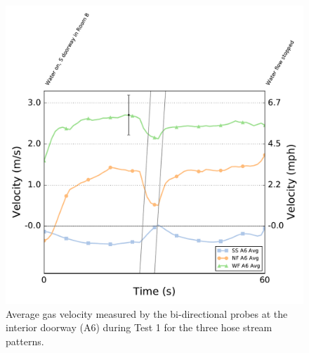 \documentclass[12pt,oneside]{book}
\begin{document}
\begin{figure}[!ht]
	\includegraphics[width=0.86\columnwidth]{../Figures/Plots/HOSE_IXXAXX_BDP_A6_stream_avgs}
	\caption[Average gas velocity through the interior doorway during Test 1 for the three hose stream patterns.]{Average gas velocity measured by the bi-directional probes at the interior doorway (A6) during Test 1 for the three hose stream patterns.}
	\label{fig:Test_1_BDP_A6_Avg_All}
\end{figure}
\FloatBarrier
\end{document}
